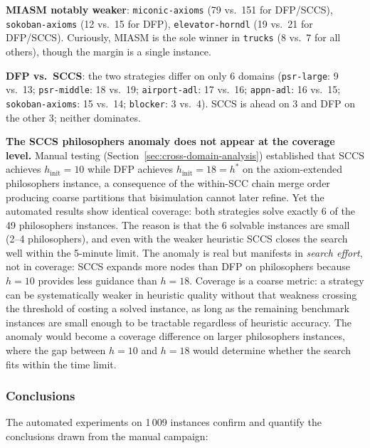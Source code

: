 \documentclass[11pt,a4paper]{article}
\begin{document}
\textbf{MIASM notably weaker}:
\texttt{miconic-axioms} (79 vs.\ 151 for DFP/SCCS),
\texttt{sokoban-axioms} (12 vs.\ 15 for DFP),
\texttt{elevator-horndl} (19 vs.\ 21 for DFP/SCCS).
Curiously, MIASM is the sole winner in \texttt{trucks} (8 vs.\ 7 for all
others), though the margin is a single instance.

\textbf{DFP vs.\ SCCS}: the two strategies differ on only 6 domains
(\texttt{psr-large}: 9 vs.\ 13; \texttt{psr-middle}: 18 vs.\ 19;
\texttt{airport-adl}: 17 vs.\ 16; \texttt{appn-adl}: 16 vs.\ 15;
\texttt{sokoban-axioms}: 15 vs.\ 14; \texttt{blocker}: 3 vs.\ 4).
SCCS is ahead on 3 and DFP on the other 3; neither dominates.

\textbf{The SCCS philosophers anomaly does not appear at the coverage level.}
Manual testing (Section~\ref{sec:cross-domain-analysis}) established that
SCCS achieves $h_{\mathrm{init}} = 10$ while DFP achieves
$h_{\mathrm{init}} = 18 = h^*$ on the axiom-extended philosophers instance,
a consequence of the within-SCC chain merge order producing coarse partitions
that bisimulation cannot later refine.
Yet the automated results show identical coverage: both strategies solve
exactly 6 of the 49 philosophers instances.
The reason is that the 6 solvable instances are small (2--4 philosophers),
and even with the weaker heuristic SCCS closes the search well within the
5-minute limit.
The anomaly is real but manifests in \emph{search effort}, not in coverage:
SCCS expands more nodes than DFP on philosophers because $h=10$ provides less
guidance than $h=18$.
Coverage is a coarse metric: a strategy can be systematically weaker in
heuristic quality without that weakness crossing the threshold of costing a
solved instance, as long as the remaining benchmark instances are small enough
to be tractable regardless of heuristic accuracy.
The anomaly would become a coverage difference on larger philosophers instances,
where the gap between $h=10$ and $h=18$ would determine whether the search
fits within the time limit.

\subsubsection{Conclusions}

The automated experiments on 1\,009 instances confirm and quantify the
conclusions drawn from the manual campaign:
\end{document}
